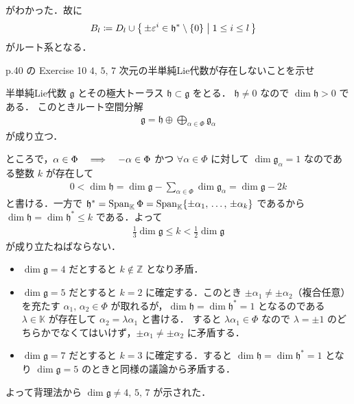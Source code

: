 \documentclass{ltjsarticle}
\makeatletter
\theoremstyle{mystyle} %
\renewcommand{\proofname}{証明}
\renewenvironment{proof}[1][\proofname]{\par
    \pushQED{\qed}%
    \normalfont \topsep6\p@\@plus6\p@\relax
    \trivlist
    \item[\hskip\labelsep
        \itshape
    \textbf{\underline{#1}}]\ignorespaces
}{%
    \popQED\endtrivlist\@endpefalse
}
\numberwithin{equation}{section}
\makeatother
\begin{document}
がわかった．故に
\begin{align}
    B_l
    &\coloneqq D_l \cup \bigl\{\, \pm \varepsilon^i \in \mathfrak{h}^* \setminus \{0\}\bigm| 1 \le i \le l \,\bigr\}
\end{align}
がルート系となる．

\begin{myproblem}[label=ex:2-8-10B]{p.40 の Exercise 10}
    $4,\, 5,\, 7$ 次元の半単純Lie代数が存在しないことを示せ
\end{myproblem}

\begin{proof}
    半単純Lie代数 $\mathfrak{g}$ とその極大トーラス $\mathfrak{h} \subset \mathfrak{g}$ をとる．
    $\mathfrak{h} \neq 0$ なので $\dim \mathfrak{h} > 0$ である．
    このときルート空間分解
    \begin{align}
        \mathfrak{g} = \mathfrak{h} \oplus \bigoplus_{\alpha \in \Phi} \mathfrak{g}_\alpha
    \end{align}
    が成り立つ．

    ところで，$\alpha \in \Phi \quad \Longrightarrow \quad -\alpha \in \Phi$ かつ $\forall \alpha \in \Phi$ に対して $\dim \mathfrak{g}_\alpha = 1$ なのである整数 $k$ が存在して
    \begin{align}
        0 < \dim \mathfrak{h} = \dim \mathfrak{g} - \sum_{\alpha \in \Phi} \dim \mathfrak{g}_\alpha = \dim \mathfrak{g} - 2k
    \end{align}
    と書ける．一方で $\mathfrak{h}^* = \operatorname{Span}_{\mathbb{K}} \Phi = \operatorname{Span}_{\mathbb{K}} \{\pm \alpha_1,\, \dots,\, \pm\alpha_k\}$ であるから $\dim \mathfrak{h} = \dim \mathfrak{h}^* \le k$ である．よって
    \begin{align}
        \frac{1}{3} \dim \mathfrak{g} \le k < \frac{1}{2} \dim \mathfrak{g}
    \end{align}
    が成り立たねばならない．
    \begin{itemize}
        \item $\dim \mathfrak{g} = 4$ だとすると $k \notin \mathbb{Z}$ となり矛盾．
        \item $\dim \mathfrak{g} = 5$ だとすると $k=2$ に確定する．このとき $\pm \alpha_1 \neq \pm \alpha_2$（複合任意）を充たす $\alpha_1,\, \alpha_2 \in \Phi$ が取れるが，$\dim \mathfrak{h} = \dim \mathfrak{h}^* = 1$ となるのである $\lambda \in \mathbb{K}$ が存在して $\alpha_2 = \lambda \alpha_1$ と書ける．
        すると $\lambda \alpha_1 \in \Phi$ なので $\lambda = \pm 1$ のどちらかでなくてはいけず，$\pm \alpha_1 \neq \pm\alpha_2$ に矛盾する．
        \item $\dim \mathfrak{g} = 7$ だとすると $k=3$ に確定する．すると $\dim \mathfrak{h} = \dim \mathfrak{h}^* = 1$ となり $\dim \mathfrak{g} = 5$ のときと同様の議論から矛盾する．
    \end{itemize}
    よって背理法から $\dim \mathfrak{g} \neq 4,\, 5,\, 7$ が示された．
\end{proof}




\end{document}
